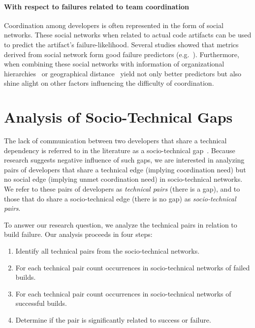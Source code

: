 \documentclass[conference]{IEEEtran}
\begin{document}
\paragraph{With respect to failures related to team coordination}
Coordination among developers is often represented in the form of social networks.
These social networks when related to actual code artifacts can be used to predict the artifact's failure-likelihood.
Several studies showed that metrics derived from social network form good failure predictors (e.g.~\cite{meneely:fse:2008}).
Furthermore, when combining these social networks with information of organizational hierarchies~\cite{nagappan:icse:2008} or geographical distance~\cite{bird:acm:2009} yield not only better predictors but also shine alight on other factors influencing the difficulty of coordination.




\section{Analysis of Socio-Technical Gaps}
The lack of communication between two developers that share a
technical dependency is referred to in the literature as a
socio-technical gap~\cite{valetto:msr:2007}. Because research suggests negative influence of such gaps, we are interested in analyzing pairs of developers that share a technical edge (implying coordination need) but no social edge (implying
unmet coordination need) in socio-technical networks. We refer to these pairs of
developers as \emph{technical pairs} (there is a gap), and to those that do
share a socio-technical edge (there is no gap) as \emph{socio-technical pairs}. 

To answer our research question, we analyze the
technical pairs in relation to build
failure. Our analysis proceeds in four steps:

\begin{enumerate}
\item Identify all technical pairs from the socio-technical networks.
\item For each technical pair count occurrences in socio-technical networks of
failed builds.
\item For each technical pair count occurrences in socio-technical networks of
successful builds.
\item Determine if the pair is significantly related to success or failure.
\end{enumerate}
\end{document}
